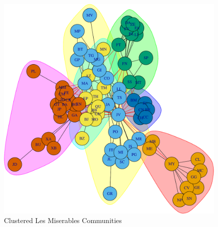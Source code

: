 \documentclass[]{article}
\begin{document}
\begin{figure}

{\centering \includegraphics{sta546_hw3_files/figure-latex/unnamed-chunk-4-1} 

}

\caption{Clustered Les Miserables Communities}\label{fig:unnamed-chunk-4}
\end{figure}
\end{document}
